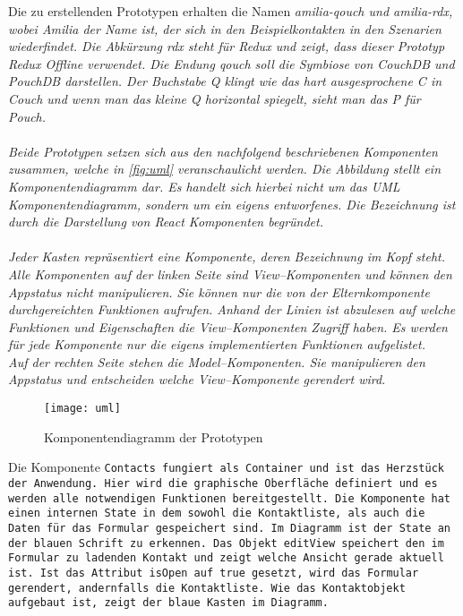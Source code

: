 Die zu erstellenden Prototypen erhalten die Namen \it{amilia-qouch} und \it{amilia-rdx}, wobei Amilia der Name ist, der sich in den Beispielkontakten in den Szenarien wiederfindet.
Die Abkürzung \it{rdx} steht für Redux und zeigt, dass dieser Prototyp Redux Offline verwendet.
Die Endung \it{qouch} soll die Symbiose von CouchDB und PouchDB darstellen. Der Buchstabe Q klingt wie das hart ausgesprochene C in Couch und wenn man das kleine Q horizontal spiegelt, sieht man das P für Pouch.\\\\
Beide Prototypen setzen sich aus den nachfolgend beschriebenen Komponenten zusammen, welche in \autoref{fig:uml} veranschaulicht werden. Die Abbildung stellt ein Komponentendiagramm dar.
Es handelt sich hierbei nicht um das UML Komponentendiagramm, sondern um ein eigens entworfenes.
Die Bezeichnung ist durch die Darstellung von React Komponenten begründet.\\\\
%
%
Jeder Kasten repräsentiert eine Komponente, deren Bezeichnung im Kopf steht.
Alle Komponenten auf der linken Seite sind View--Komponenten und können den Appstatus nicht manipulieren.
Sie können nur die von der Elternkomponente durchgereichten Funktionen aufrufen.
Anhand der Linien ist abzulesen auf welche Funktionen und Eigenschaften die View--Komponenten Zugriff haben.
Es werden für jede Komponente nur die eigens implementierten Funktionen aufgelistet.\\
Auf der rechten Seite stehen die Model--Komponenten. Sie manipulieren den Appstatus und entscheiden welche View--Komponente gerendert wird.
%
\begin{figure}[ht]
  \centering
  \texttt{[image: uml]}
  \grayRule
  \caption[Komponentendiagramm]{Komponentendiagramm der Prototypen}
  \label{fig:uml}
\end{figure}
%
Die Komponente \tt{Contacts} fungiert als Container und ist das Herzstück der Anwendung.
Hier wird die graphische Oberfläche definiert und es werden alle notwendigen Funktionen bereitgestellt.
Die Komponente hat einen internen State in dem sowohl die Kontaktliste, als auch die Daten für das Formular gespeichert sind. Im Diagramm ist der State an der blauen Schrift zu erkennen.
Das Objekt \tt{editView}  speichert den im Formular zu ladenden Kontakt und zeigt welche Ansicht gerade aktuell ist. Ist das Attribut \tt{isOpen} auf \tt{true} gesetzt, wird das Formular gerendert, andernfalls die Kontaktliste.
Wie das Kontaktobjekt aufgebaut ist, zeigt der blaue Kasten im Diagramm.
